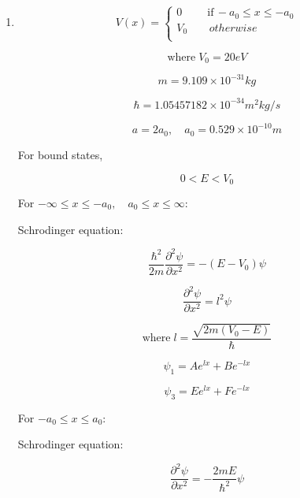 \documentclass[12pt]{article}
\begin{document}
\begin{enumerate}
    \item

          \begin{equation*}
              V(x) =
              \begin{cases}
                  0 \quad   & \text{if} \, -a_0 \leq x \leq -a_0 \\
                  V_0 \quad & \, otherwise                       \\
              \end{cases}
          \end{equation*}

          \[
              \text{where}\; V_0 = 20eV
          \]

          \[
              m = 9.109 \times 10^{-31} kg
          \]

          \[
              \hbar = 1.05457182 \times 10^{-34} m^2 kg / s
          \]

          \[
              a = 2a_0, \quad a_0 = 0.529 \times 10^{-10}m
          \]

          For bound states,

          \[
              0 < E < V_0
          \]

          For \(-\infty \leq x \leq -a_0,\quad a_0 \leq x \leq \infty \):

          Schrodinger equation:

          \[
              \frac{\hbar^2}{2m}\frac{\partial^2 \psi}{\partial x^2} = -(E - V_0) \psi
          \]


          \[
              \frac{\partial^2 \psi}{\partial x^2} = l^2 \psi
          \]

          \[
              \text{where}\; l = \frac{\sqrt{2m (V_0 - E)}}{\hbar}
          \]

          \[
              \psi_1 = A e^{l x} + B e^{- l x}
          \]

          \[
              \psi_3 = E e^{l x} + F e^{- l x}
          \]

          For \(-a_0 \leq x \leq a_0 \):

          Schrodinger equation:

          \[
              \frac{\partial^2 \psi}{\partial x^2} = -\frac{2mE}{\hbar^2} \psi
          \]


\end{enumerate}
\end{document}
